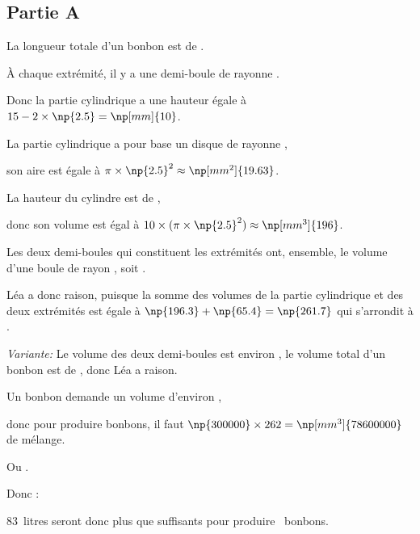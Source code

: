 \documentclass[12pt,a4paper,french]{article}
\begin{document}
\subsection*{Partie A}
\begin{énumérer}
	\item La longueur totale d'un bonbon est de .

	À chaque extrémité, il y a une demi-boule de rayonne .

	Donc la partie cylindrique a une hauteur égale à {$15-2\times\np{2.5}=\np[mm]{10}$.}

	\item \begin{énumérer}
		\item La partie cylindrique a pour base un disque de rayonne ,

		son aire est égale à {$\pi \times\np{2.5}^2\approx\np[mm^2]{19.63}$}.

		La hauteur du cylindre est de ,

		donc son volume est égal à {$10\times(\pi\times\np{2.5}^2)\approx \np[mm^3]{196}$.}

		\item Les deux demi-boules qui constituent les extrémités ont, ensemble, le volume d'une boule de rayon , soit .

		Léa a donc raison, puisque la somme des volumes de la partie cylindrique et des deux extrémités est égale à {$\np{196.3}+\np{65.4}=\np{261.7}$} qui s'arrondit à .

		\textit{Variante:} Le volume des deux demi-boules est environ , le volume total d'un bonbon est de , donc Léa a raison.
	\end{énumérer}

	\item Un bonbon demande un volume d'environ ,

	donc pour produire  bonbons, il faut {$\np{300000}\times262=\np[mm^3]{78600000}$} de mélange.

	Ou .

	Donc  :

	83~litres seront donc plus que suffisants pour produire ~bonbons.
\end{énumérer}
\end{document}
